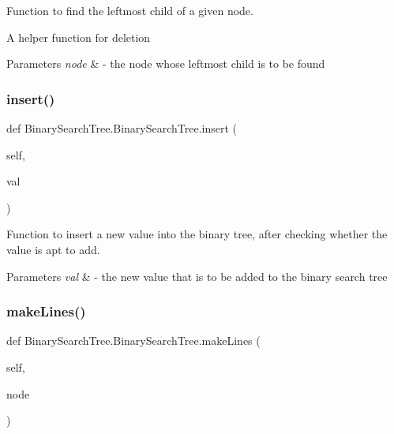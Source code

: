 Function to find the leftmost child of a given node. 

A helper function for deletion


\begin{DoxyParams}{Parameters}
{\em node} & -\/ the node whose leftmost child is to be found \\
\hline
\end{DoxyParams}
\mbox{\label{class_binary_search_tree_1_1_binary_search_tree_ab410c124ca03f9cb2f8b7f72a1529196}} 
\subsubsection{\texorpdfstring{insert()}{insert()}}
{\footnotesize\ttfamily def Binary\+Search\+Tree.\+Binary\+Search\+Tree.\+insert (\begin{DoxyParamCaption}\item[{}]{self,  }\item[{}]{val }\end{DoxyParamCaption})}



Function to insert a new value into the binary tree, after checking whether the value is apt to add. 


\begin{DoxyParams}{Parameters}
{\em val} & -\/ the new value that is to be added to the binary search tree \\
\hline
\end{DoxyParams}
\mbox{\label{class_binary_search_tree_1_1_binary_search_tree_a64a520f74e40f705873893befbe905c3}} 
\subsubsection{\texorpdfstring{make\+Lines()}{makeLines()}}
{\footnotesize\ttfamily def Binary\+Search\+Tree.\+Binary\+Search\+Tree.\+make\+Lines (\begin{DoxyParamCaption}\item[{}]{self,  }\item[{}]{node }\end{DoxyParamCaption})}



